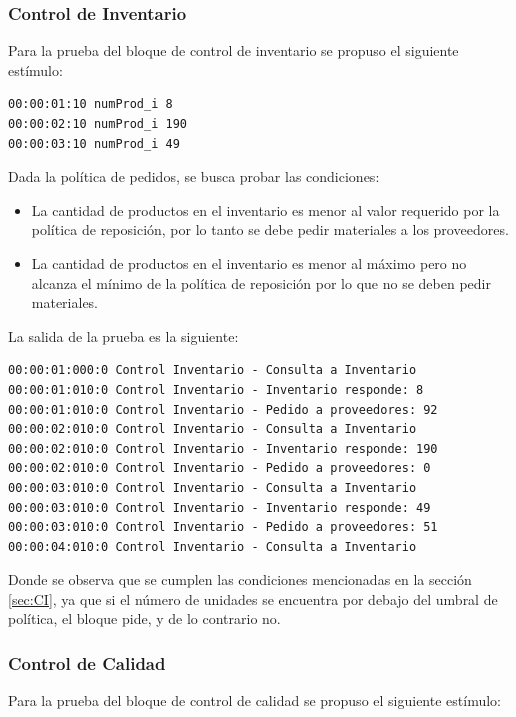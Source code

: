 \documentclass[10pt]{article}
\begin{document}
\subsubsection{Control de Inventario}
Para la prueba del bloque de control de inventario se propuso el siguiente estímulo:

\begin{minipage}{1\textwidth}
	\centering
	\begin{lstlisting}
00:00:01:10 numProd_i 8
00:00:02:10 numProd_i 190
00:00:03:10 numProd_i 49
	\end{lstlisting}
\end{minipage}

Dada la política de pedidos, se busca probar las condiciones:
\begin{itemize}
\item La cantidad de productos en el inventario es menor al valor requerido por la política de reposición, por lo tanto se debe pedir materiales a los proveedores.
\item  La cantidad de productos en el inventario es menor al máximo pero no alcanza el mínimo de la política de reposición por lo que no se deben pedir materiales.
\end{itemize}

La salida de la prueba es la siguiente:

\centering
\begin{minipage}{1\textwidth}
	\centering
	\begin{lstlisting}
00:00:01:000:0 Control Inventario - Consulta a Inventario
00:00:01:010:0 Control Inventario - Inventario responde: 8
00:00:01:010:0 Control Inventario - Pedido a proveedores: 92
00:00:02:010:0 Control Inventario - Consulta a Inventario
00:00:02:010:0 Control Inventario - Inventario responde: 190
00:00:02:010:0 Control Inventario - Pedido a proveedores: 0
00:00:03:010:0 Control Inventario - Consulta a Inventario
00:00:03:010:0 Control Inventario - Inventario responde: 49
00:00:03:010:0 Control Inventario - Pedido a proveedores: 51
00:00:04:010:0 Control Inventario - Consulta a Inventario
	\end{lstlisting}
	
\end{minipage}
Donde se observa que se cumplen las condiciones mencionadas en la sección \ref{sec:CI}, ya que si el número de unidades se encuentra por debajo del umbral de política, el bloque pide, y de lo contrario no. 

\subsubsection{Control de Calidad}
Para la prueba del bloque de control de calidad se propuso el siguiente estímulo:
\end{document}
